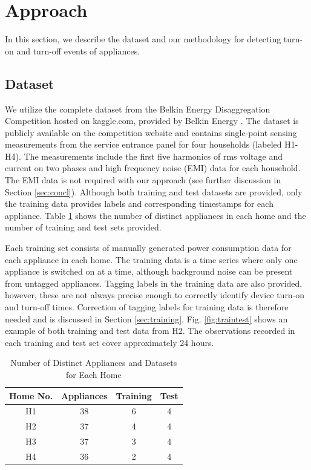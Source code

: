 \documentclass[conference]{IEEEtran}
\begin{document}
\section{Approach}\label{sec:dataMethod}

In this section, we describe the dataset and our methodology for detecting turn-on and turn-off events of appliances. 

\subsection{Dataset}
We utilize the complete dataset from the Belkin Energy Disaggregation Competition hosted on kaggle.com, provided by Belkin Energy \cite{Kaggle}.  The dataset is publicly available on the competition website and contains single-point sensing measurements from the service entrance panel for four households (labeled H1-H4).  The measurements include the first five harmonics of rms voltage and current on two phases and high frequency noise (EMI) data for each household.  The EMI data is not required with our approach (see further discussion in Section \ref{sec:concl}).  Although both training and test datasets are provided, only the training data provides labels and corresponding timestamps for each appliance. Table \ref{table:dataset} shows the number of distinct appliances in each home and the number of training and test sets provided. 

Each training set consists of manually generated power consumption data for each appliance in each home.  The training data is a time series where only one appliance is switched on at a time, although background noise can be present from untagged appliances. Tagging labels in the training data are also provided, however, these are not always precise enough to correctly identify device turn-on and turn-off times. Correction of tagging labels for training data is therefore needed and is discussed in Section \ref{sec:training}.  Fig. \ref{fig:traintest} shows an example of both training and test data from H2.  The observations recorded in each training and test set cover approximately 24 hours.  

\begin{table}[!t]
	\renewcommand{\arraystretch}{1.3}
	\caption{Number of Distinct Appliances and Datasets for Each Home}\label{classes}
	\label{table:dataset}
	\centering
	\begin{tabular}{c||c||c||c}
		\hline 
		\textbf{Home No.} & \textbf{Appliances} &\textbf{Training} &\textbf{Test}\tabularnewline
		\hline 
		\hline 
		H1 & 38 & 6 & 4\tabularnewline
		\hline 
		H2 & 37 & 4 & 4\tabularnewline
		\hline 
		H3 & 37 & 3 & 4\tabularnewline
		\hline 
		H4 & 36 & 2 & 4\tabularnewline
		\hline 
	\end{tabular}
\end{table}
\end{document}
